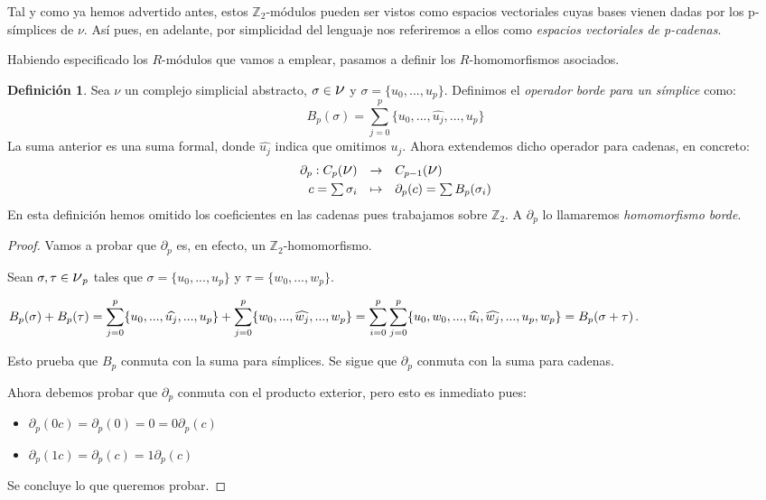 \documentclass[12pt, a4paper, twoside]{book}
\numberwithin{equation}{section}
\theoremstyle{definition}
\newtheorem{defi}{Definición}
\theoremstyle{remark}
\theoremstyle{plain}
\begin{document}
	Tal y como ya hemos advertido antes, estos $\mathbb{Z}_{2}$-módulos 
	pueden ser vistos como espacios vectoriales cuyas bases vienen dadas 
	por los p-símplices de {\Large $\nu$}. Así pues, en adelante, por 
	simplicidad del lenguaje nos referiremos a ellos como \emph{espacios 
	vectoriales de p-cadenas}.

	Habiendo especificado los $R$-módulos que vamos a emplear, pasamos a
	definir los $R$-homomorfismos asociados.

	\begin{defi}
		Sea {\Large $\nu$} un complejo simplicial abstracto, $\sigma 
		\in \text{{\Large $\nu$}}$ y $\sigma = \{u_{0},...,u_{p}\}$. 
		Definimos el \textit{operador borde para un símplice}
		como:
		$$
		B_{p}(\sigma)=\displaystyle 
		\sum_{j=0}^{p}\{u_{0},...,\widehat{u_{j}},...,u_{p}\}
		$$
 		La suma anterior es una suma formal, donde $\widehat{u_{j}}$ 
		indica que omitimos $u_{j}$. Ahora extendemos dicho operador 
		para cadenas, en concreto:
	\begin{equation}
		\label{def:borde_form}
		\begin{array}{lll}
			\partial_{p}:C_{p}(\text{{\Large $\nu$}}) & 
				\rightarrow & C_{p-1}(\text{{\Large $\nu$}})
				\\[3pt] 
			\multicolumn{1}{r}{c=\sum\sigma_{i}} & \mapsto & 
			\partial_{p}(c)=\sum B_{p}(\sigma_{i})
		\end{array}
	\end{equation}
	En esta definición hemos omitido los coeficientes en las cadenas pues
	trabajamos sobre $\mathbb{Z}_{2}$. A $\partial_{p}$ lo llamaremos 
	\textit{homomorfismo borde}.	
	\end{defi}

	\begin{proof}
		Vamos a probar que $\partial_{p}$ es, en efecto, un 
		$\mathbb{Z}_{2}$-homomorfismo.

		Sean $\sigma,\tau \in \text{{\Large $\nu$}}_{p}$ tales que
		$\sigma = \{u_{0},...,u_{p}\}$ y $\tau = \{w_{0},...,w_{p}\}$.

		$B_{p}(\sigma)+B_{p}(\tau)=\displaystyle 
		\sum_{j=0}^{p}\{u_{0},...,\widehat{u_{j}},...,u_{p}\} + 
		\displaystyle \sum_{j=0}^{p}\{w_{0},...,\widehat{w_{j}},...,
		w_{p}\}=\displaystyle \sum_{i=0}^{p}\sum_{j=0}^{p}\{u_{0}, 
		w_{0},...,\widehat{u_{i}},\\\widehat{w_{j}},...,u_{p},w_{p}\}=
		B_{p}(\sigma+\tau)$. 

		Esto prueba que $B_{p}$ conmuta con la suma para 
		símplices. Se sigue que $\partial_{p}$ conmuta 
		con la suma para cadenas.

		Ahora debemos probar que $\partial_{p}$ conmuta con el 
		producto exterior, pero esto es inmediato pues:
		\begin{itemize}
			\item $\partial_{p}(0c)=\partial_{p}(0)=0=
				0\partial_{p}(c)$
			\item $\partial_{p}(1c)=\partial_{p}(c)=
				1\partial_{p}(c)$
		\end{itemize}
		Se concluye lo que queremos probar.
	\end{proof}
\end{document}
